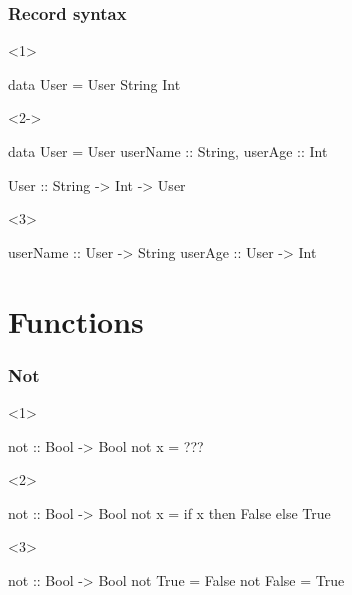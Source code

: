 \documentclass[17pt]{beamer}
\renewcommand{\(}[1]{\begin{columns}[#1]}
\renewcommand{\)}{\end{columns}}
\newcommand{\<}[1]{\begin{column}{#1}}
\renewcommand{\>}{\end{column}}
\begin{document}
\begin{frame}[fragile]
\frametitle{Record syntax}
\begin{minipage}[t][0.4\textheight]{1.0\linewidth}
\begin{onlyenv}<1>
\begin{code}
          data User = User String Int
\end{code}
\end{onlyenv}
\begin{onlyenv}<2->
\begin{code}
          data User = User {
              userName :: String,
              userAge  :: Int
          }
\end{code}
\end{onlyenv}
\end{minipage}
\begin{code}
          User     :: String -> Int -> User
\end{code}
\begin{uncoverenv}<3>
\begin{code}
          userName :: User -> String
          userAge  :: User -> Int
\end{code}
\end{uncoverenv}
\end{frame}




\section{Functions}

\begin{frame}[fragile]
\frametitle{Not}
\begin{minipage}[t][.4\textheight]{\textwidth}
\begin{onlyenv}<1>
  \begin{code}
    not :: Bool -> Bool
    not x = ???
  \end{code}
\end{onlyenv}
\begin{onlyenv}<2>
  \begin{code}
    not :: Bool -> Bool
    not x = if x then False else True
  \end{code}
\end{onlyenv}
\begin{onlyenv}<3>
  \begin{code}
    not :: Bool -> Bool
    not True  = False
    not False = True
  \end{code}
\end{onlyenv}
\end{minipage}
\begin{minipage}[c][.3\textheight]{\textwidth}
\begin{center}
\end{center}
\end{minipage}
\end{frame}
\end{document}
